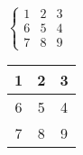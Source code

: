 \documentclass[a4paper,12pt]{article}
\begin{document}
$ \left\{
\begin{array}{rlc}
    1 & 2 & 3\\
    6 & 5 & 4\\
    7 & 8 & 9
\end{array}
\right.
$

\vspace{2cm}

\begin{tabular}{|c|c|c|}
    \hline
     \textbf{1} & \textbf{2} & \textbf{3}\\\hline
     6 & 5 & 4\\\hline 
     7 & 8 & 9\\\hline 
\end{tabular}
\end{document}
